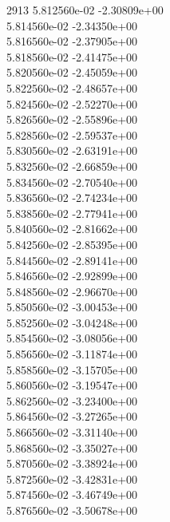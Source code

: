 2913	5.812560e-02	-2.30809e+00	\\ 	5.814560e-02	-2.34350e+00	\\ 	5.816560e-02	-2.37905e+00	\\ 	5.818560e-02	-2.41475e+00	\\ 	5.820560e-02	-2.45059e+00	\\ 	5.822560e-02	-2.48657e+00	\\ 	5.824560e-02	-2.52270e+00	\\ 	5.826560e-02	-2.55896e+00	\\ 	5.828560e-02	-2.59537e+00	\\ 	5.830560e-02	-2.63191e+00	\\ 	5.832560e-02	-2.66859e+00	\\ 	5.834560e-02	-2.70540e+00	\\ 	5.836560e-02	-2.74234e+00	\\ 	5.838560e-02	-2.77941e+00	\\ 	5.840560e-02	-2.81662e+00	\\ 	5.842560e-02	-2.85395e+00	\\ 	5.844560e-02	-2.89141e+00	\\ 	5.846560e-02	-2.92899e+00	\\ 	5.848560e-02	-2.96670e+00	\\ 	5.850560e-02	-3.00453e+00	\\ 	5.852560e-02	-3.04248e+00	\\ 	5.854560e-02	-3.08056e+00	\\ 	5.856560e-02	-3.11874e+00	\\ 	5.858560e-02	-3.15705e+00	\\ 	5.860560e-02	-3.19547e+00	\\ 	5.862560e-02	-3.23400e+00	\\ 	5.864560e-02	-3.27265e+00	\\ 	5.866560e-02	-3.31140e+00	\\ 	5.868560e-02	-3.35027e+00	\\ 	5.870560e-02	-3.38924e+00	\\ 	5.872560e-02	-3.42831e+00	\\ 	5.874560e-02	-3.46749e+00	\\ 	5.876560e-02	-3.50678e+00	\\ \hline
